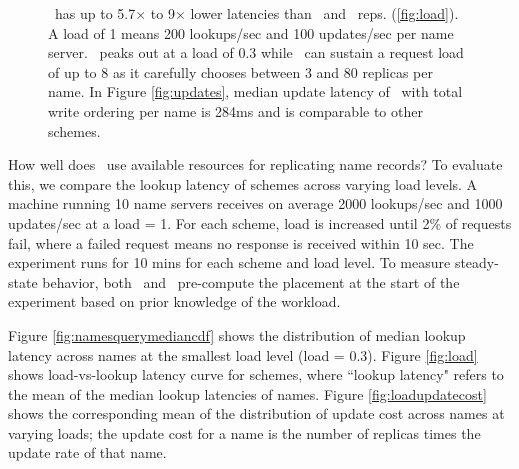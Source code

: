 \begin{figure}[t]
\caption{\small{\auspice\ has up to 5.7$\times$ to 9$\times$ lower latencies than \staticthree\ and \codons\ reps. (\ref{fig:load}). A load of 1 means 200 lookups/sec and 100 updates/sec per name server. \replicateall\ peaks out at a load of 0.3 while \auspice\ can sustain a request load of up to 8 as it carefully chooses between 3 and 80 replicas per name. In Figure \ref{fig:updates}, median update latency of \auspice\ with total write ordering per name is 284ms and is comparable to other  schemes.}}
\vspace{-0.15in}
\label{fig:lookupupdate}
\end{figure}

How well does \auspice\ use available resources for replicating name records? To evaluate this, we compare the lookup latency of schemes across varying load levels. A machine running 10 name servers receives on average 2000 lookups/sec and 1000 updates/sec at a load = 1. For each scheme, load is increased  until  2\% of requests fail, where a failed request means no response is received within 10 sec. The experiment runs for 10 mins for each scheme and load level. To measure steady-state behavior, both \auspice\ and \codons\ pre-compute the placement at the start of the experiment based on prior knowledge of the workload.%

Figure \ref{fig:namesquerymediancdf} shows the distribution of median lookup latency across names at the smallest load level (load = 0.3).  Figure \ref{fig:load} shows load-vs-lookup latency curve for schemes, where ``lookup latency" refers to the mean of the median lookup latencies of names. Figure \ref{fig:loadupdatecost} shows the corresponding mean of the distribution of update cost across names at varying loads; the update cost for a name is the number of replicas times the update rate of that name.


